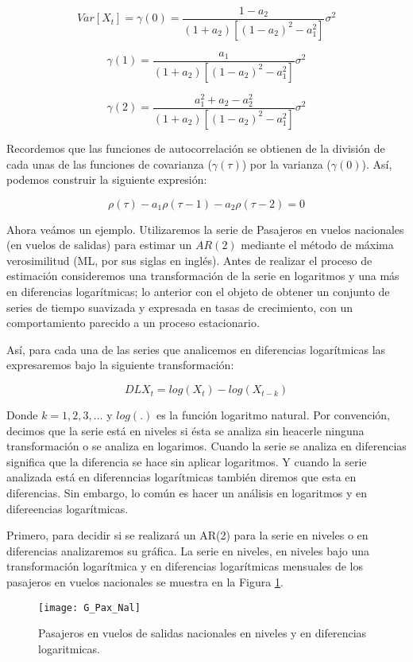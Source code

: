 \documentclass[
  a4paper,
]{article}
\begin{document}
\[
Var[X_t] = \gamma(0) = \frac{1 - a_2}{(1 + a_2)[(1 - a_2)^2 - a^2_1]} \sigma^2
\]

\[
\gamma(1) = \frac{a_1}{(1 + a_2)[(1 - a_2)^2 - a^2_1]} \sigma^2
\]

\[
\gamma(2) = \frac{a^2_1 + a_2 - a^2_2}{(1 + a_2)[(1 - a_2)^2 - a^2_1]} \sigma^2
\]

Recordemos que las funciones de autocorrelación se obtienen de la
división de cada unas de las funciones de covarianza (\(\gamma(\tau)\))
por la varianza (\(\gamma(0)\)). Así, podemos construir la siguiente
expresión:

\[
\rho(\tau) - a_1 \rho(\tau - 1) - a_2 \rho(\tau - 2) = 0
\]

Ahora veámos un ejemplo. Utilizaremos la serie de Pasajeros en vuelos
nacionales (en vuelos de salidas) para estimar un \(AR(2)\) mediante el
método de máxima verosimilitud (ML, por sus siglas en inglés). Antes de
realizar el proceso de estimación consideremos una transformación de la
serie en logaritmos y una más en diferencias logarítmicas; lo anterior
con el objeto de obtener un conjunto de series de tiempo suavizada y
expresada en tasas de crecimiento, con un comportamiento parecido a un
proceso estacionario.

Así, para cada una de las series que analicemos en diferencias
logarítmicas las expresaremos bajo la siguiente transformación:

\[
    DLX_t = log(X_t) - log(X_{t-k})
\]

Donde \(k = 1, 2, 3, \ldots\) y \(log(.)\) es la función logaritmo
natural. Por convención, decimos que la serie está en niveles si ésta se
analiza sin heacerle ninguna transformación o se analiza en logarimos.
Cuando la serie se analiza en diferencias significa que la diferencia se
hace sin aplicar logaritmos. Y cuando la serie analizada está en
diferenncias logarítmicas también diremos que esta en diferencias. Sin
embargo, lo común es hacer un análisis en logaritmos y en difereencias
logarítmicas.

Primero, para decidir si se realizará un AR(2) para la serie en niveles
o en diferencias analizaremos su gráfica. La serie en niveles, en
niveles bajo una transformación logarítmica y en diferencias
logarítmicas mensuales de los pasajeros en vuelos nacionales se muestra
en la Figura \ref{G_Pax_Nal}.

\begin{figure}
  \centering
    \texttt{[image: G\_Pax\_Nal]}
  \caption{Pasajeros en vuelos de salidas nacionales en niveles y en diferencias logaritmicas.}
  \label{G_Pax_Nal}
\end{figure}
\end{document}
